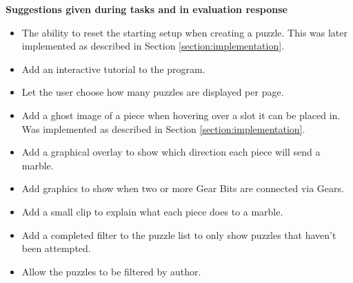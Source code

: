 \documentclass{l4proj}
\begin{document}
\textbf{Suggestions given during tasks and in evaluation response}
\label{suggestions}
\begin{itemize}
    \item The ability to reset the starting setup when creating a puzzle. This was later implemented as described in Section \ref{section:implementation}.
    \item Add an interactive tutorial to the program.
    \item Let the user choose how many puzzles are displayed per page.
    \item Add a ghost image of a piece when hovering over a slot it can be placed in. Was implemented as described in Section \ref{section:implementation}.
    \item Add a graphical overlay to show which direction each piece will send a marble.
    \item Add graphics to show when two or more Gear Bits are connected via Gears.
    \item Add a small clip to explain what each piece does to a marble.
    \item Add a completed filter to the puzzle list to only show puzzles that haven't been attempted.
    \item Allow the puzzles to be filtered by author.
\end{itemize}
\end{document}
